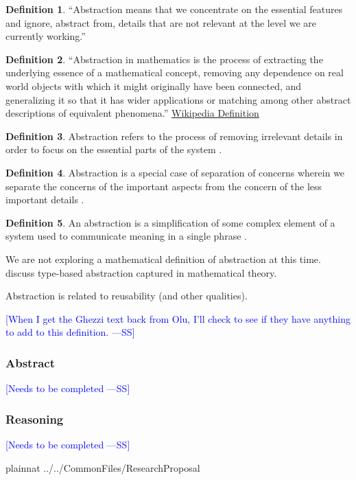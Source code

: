 \documentclass[letterpaper, cleveref]{lipics-v2019}
\newcommand{\authornote}[3]{\textcolor{#1}{[#3 ---#2]}}
\newcommand{\authornote}[3]{}
\newcommand{\wss}[1]{\authornote{blue}{SS}{#1}} %
\theoremstyle{definition}
\newtheorem{defn}{Definition}
\begin{document}
\begin{defn}
  ``Abstraction means that we concentrate on the essential features and ignore,
  abstract from, details that are not relevant at the level we are currently
  working.''  \citep[p.\ 296]{VanVliet2000}
\end{defn}

\begin{defn}
  ``Abstraction in mathematics is the process of extracting the underlying
  essence of a mathematical concept, removing any dependence on real world
  objects with which it might originally have been connected, and generalizing
  it so that it has wider applications or matching among other abstract
  descriptions of equivalent phenomena.''
  \href{https://en.wikipedia.org/wiki/Abstraction_(mathematics)} {Wikipedia
    Definition}
\end{defn}

\begin{defn}
Abstraction refers to the process of removing irrelevant details in order to focus on the essential parts of the system \citep{filipovikj2017pattern}.
\end{defn}	

\begin{defn}
Abstraction is a special case of separation of concerns wherein we separate the concerns of the important aspects from the concern of the less important details \citep{GhezziEtAl2003}.
\end{defn}

\begin{defn}
An abstraction is a simplification of some complex element of a system used to communicate meaning in a single phrase \citep{roger2015software}.
\end{defn}

We are not exploring a mathematical definition of abstraction at this time. \cite{ma1991types} discuss type-based abstraction captured in mathematical theory.

Abstraction is related to reusability (and other qualities).

\wss{When I get the Ghezzi text back from Olu, I'll check to see if they have
  anything to add to this definition.}

\begin{mybox}
\subsubsection*{Abstract} 
\wss{Needs to be completed}
\end{mybox}

\subsubsection*{Reasoning}

\wss{Needs to be completed}


\newpage

 {plainnat}
 {../../CommonFiles/ResearchProposal}
\end{document}
